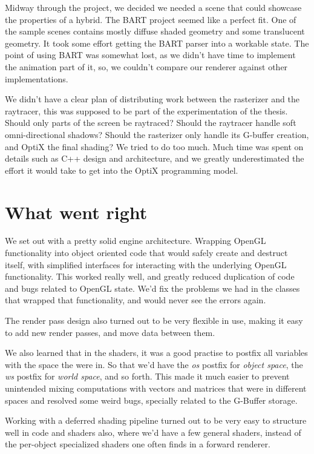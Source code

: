 Midway through the project, we decided we needed a scene that could showcase the properties of a hybrid. The BART project seemed like a perfect fit. One of the sample scenes contains mostly diffuse shaded geometry and some translucent geometry. It took some effort getting the BART parser into a workable state. The point of using BART was somewhat lost, as we didn't have time to implement the animation part of it, so, we couldn't compare our renderer against other implementations.

We didn't have a clear plan of distributing work between the rasterizer and the raytracer, this was supposed to be part of the experimentation of the thesis. Should only parts of the screen be raytraced? Should the raytracer handle soft omni-directional shadows? Should the rasterizer only handle its G-buffer creation, and OptiX the final shading? We tried to do too much. Much time was spent on details such as C++ design and architecture, and we greatly underestimated the effort it would take to get into the OptiX programming model.

\section{What went right}
We set out with a pretty solid engine architecture. Wrapping OpenGL functionality into object oriented code that would safely create and destruct itself, with simplified interfaces for interacting with the underlying OpenGL functionality. This worked really well, and greatly reduced duplication of code and bugs related to OpenGL state. We'd fix the problems we had in the classes that wrapped that functionality, and would never see the errors again.

The render pass design also turned out to be very flexible in use, making it easy to add new render passes, and move data between them.

We also learned that in the shaders, it was a good practise to postfix all variables with the space the were in. So that we'd have the \emph{os} postfix for \emph{object space}, the \emph{ws} postfix for \emph{world space}, and so forth. This made it much easier to prevent unintended mixing computations with vectors and matrices that were in different spaces and resolved some weird bugs, specially related to the G-Buffer storage.

Working with a deferred shading pipeline turned out to be very easy to structure well in code and shaders also, where we'd have a few general shaders, instead of the per-object specialized shaders one often finds in a forward renderer.

